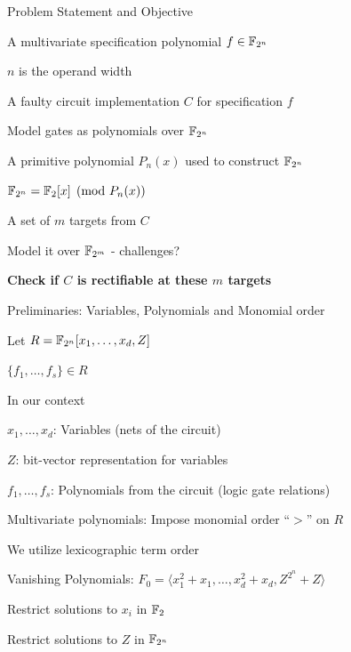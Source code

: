 \begin{frame}{\large Problem Statement and Objective}
\bi
	\item A multivariate specification polynomial $f \in {\mathbb{F}}_{2^n}$
	\bi
		\item $n$ is the operand width
	\ei 
	\pause
	\vspace{0.1in}
	\item A faulty circuit implementation $C$ for specification $f$ 
	\bi
		\item Model gates as polynomials over ${\mathbb{F}}_{2^n}$
	\ei
	\pause
	\vspace{0.1in}
	\item A primitive polynomial $P_n(x)$ used to construct ${\mathbb{F}}_{2^n}$
	\bi
		\item ${\mathbb{F}}_{2^n} = {\mathbb{F}}_2[x] \pmod{ P_n(x)}$
	\ei
	\pause
	\vspace{0.1in}
	\item A set of $m$ targets from $C$
	\bi
		\item Model it over ${\mathbb{F}}_{2^m}$ - challenges?
	\ei
	\pause 
	\vspace{0.1in}
	\vspace{0.1in}
	\item {\bf Check if $C$ is rectifiable at these $m$ targets }
\ei
\end{frame}


\begin{frame}{\large Preliminaries: Variables, Polynomials and Monomial order}
\bi
	\item Let $R={\mathbb{F}}_{2^n}[x_1,\dots,x_d,Z]$
	\bi
		\item $\{f_1, \dots, f_s\} \in R$
	\ei
	\vspace{0.1in}
	\pause
	\item In our context
	\bi
		\item $x_1,\dots,x_d$: Variables (nets of the circuit)
		\item $Z$: bit-vector representation for variables
		\item $f_1, \dots, f_s$: Polynomials from the circuit (logic gate relations)
	\ei
	\vspace{0.1in}
	\pause
	\item Multivariate polynomials: Impose monomial order ``$>$'' on $R$
	\bi
		\item We utilize lexicographic term order
	\ei
	\vspace{0.1in}
	\pause
    \item Vanishing Polynomials: $F_0 =  \langle x_1^2+x_1,\dots,x_d^2+x_d, Z^{2^n}+Z\rangle$
	\bi
		\item Restrict solutions to $x_i$ in ${\mathbb{F}}_2$
		\item Restrict solutions to $Z$ in ${\mathbb{F}}_{2^n}$
	\ei
\ei
\end{frame}

